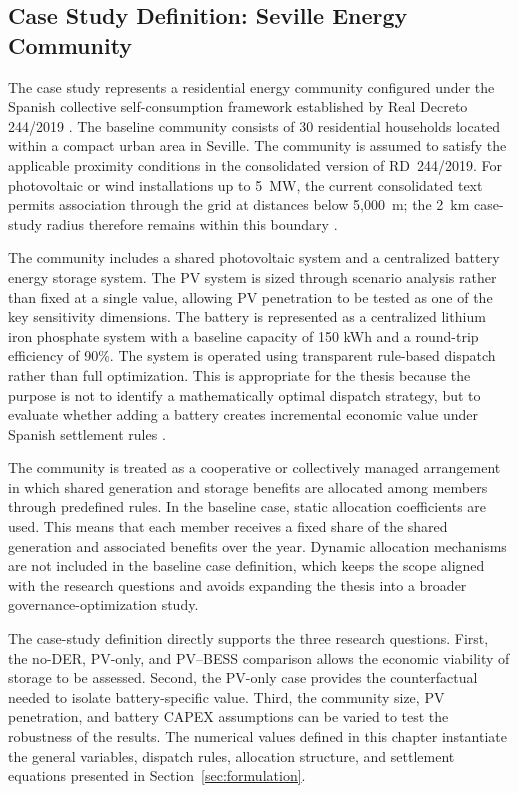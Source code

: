 \subsection{Case Study Definition: Seville Energy Community}
\label{sec:case_study_seville_energy_community}

The case study represents a residential energy community configured under the Spanish collective self-consumption framework established by Real Decreto 244/2019 \cite{boe2019real}. The baseline community consists of 30 residential households located within a compact urban area in Seville. The community is assumed to satisfy the applicable proximity conditions in the consolidated version of RD~244/2019. For photovoltaic or wind installations up to 5~MW, the current consolidated text permits association through the grid at distances below 5,000~m; the 2~km case-study radius therefore remains within this boundary \cite{boe2019real}.

The community includes a shared photovoltaic system and a centralized battery energy storage system. The PV system is sized through scenario analysis rather than fixed at a single value, allowing PV penetration to be tested as one of the key sensitivity dimensions. The battery is represented as a centralized lithium iron phosphate system with a baseline capacity of 150 kWh and a round-trip efficiency of 90\%. The system is operated using transparent rule-based dispatch rather than full optimization. This is appropriate for the thesis because the purpose is not to identify a mathematically optimal dispatch strategy, but to evaluate whether adding a battery creates incremental economic value under Spanish settlement rules \cite{iea2024international,nrel2024national}. 

The community is treated as a cooperative or collectively managed arrangement in which shared generation and storage benefits are allocated among members through predefined rules. In the baseline case, static allocation coefficients are used. This means that each member receives a fixed share of the shared generation and associated benefits over the year. Dynamic allocation mechanisms are not included in the baseline case definition, which keeps the scope aligned with the research questions and avoids expanding the thesis into a broader governance-optimization study.

The case-study definition directly supports the three research questions. First, the no-DER, PV-only, and PV--BESS comparison allows the economic viability of storage to be assessed. Second, the PV-only case provides the counterfactual needed to isolate battery-specific value. Third, the community size, PV penetration, and battery CAPEX assumptions can be varied to test the robustness of the results. The numerical values defined in this chapter instantiate the general variables, dispatch rules, allocation structure, and settlement equations presented in Section~\ref{sec:formulation}.

